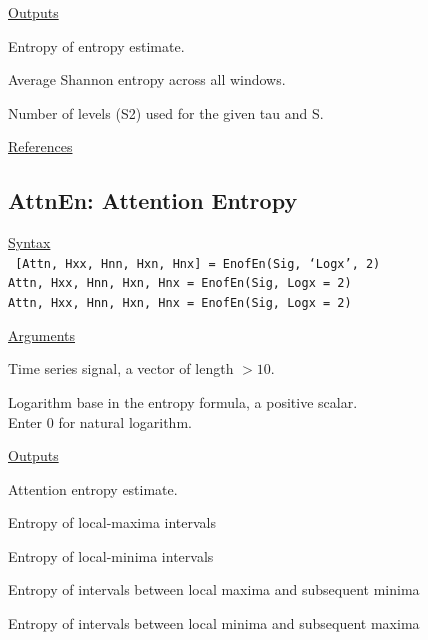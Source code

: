 \documentclass[12pt, a4paper, titlepage, openany]{book}
\begin{document}
\noindent \ul{Outputs}
\begin{description}[labelsep=1cm, labelwidth=2cm, nosep, style=multiline,leftmargin=3cm]\footnotesize
\item[\texttt{EoE}]	Entropy of entropy estimate.
\item[\texttt{AvEn}]	Average Shannon entropy across all windows.
\item[\texttt{S2}]	Number of levels (S2) used for the given tau and S.
\end{description}

\noindent \ul{References}\hspace{1cm}
\cite{EoE1}



\newpage
\subsection{\normalsize AttnEn: \hspace{15mm} Attention Entropy}
\noindent\ul{Syntax} \vspace{6mm} \\ \noindent \texttt{\footnotesize
[Attn, Hxx, Hnn, Hxn, Hnx]  = EnofEn(Sig, ‘Logx’, 2) \\
Attn, Hxx, Hnn, Hxn, Hnx = EnofEn(Sig, Logx = 2) \\
Attn, Hxx, Hnn, Hxn, Hnx = EnofEn(Sig, Logx = 2)}

\noindent \ul{Arguments}
\begin{description}[labelsep=1cm, labelwidth=2cm, nosep, style=multiline,leftmargin=3cm]\footnotesize
\item[\texttt{Sig}]		Time series signal, a vector of length $> 10$.
\item[\texttt{Logx}]	Logarithm base in the entropy formula, a positive scalar.\\
		Enter 0 for natural logarithm.
\end{description}

\noindent \ul{Outputs}
\begin{description}[labelsep=1cm, labelwidth=2cm, nosep, style=multiline,leftmargin=3cm]\footnotesize
\item[\texttt{Attn}]	Attention entropy estimate.
\item[\texttt{Hxx}]	    Entropy of local-maxima intervals
\item[\texttt{Hnn}]	    Entropy of local-minima intervals
\item[\texttt{Hxn}]	    Entropy of intervals between local maxima and subsequent minima
\item[\texttt{Hnx}]	    Entropy of intervals between local minima and subsequent maxima  
\end{description}
\end{document}
